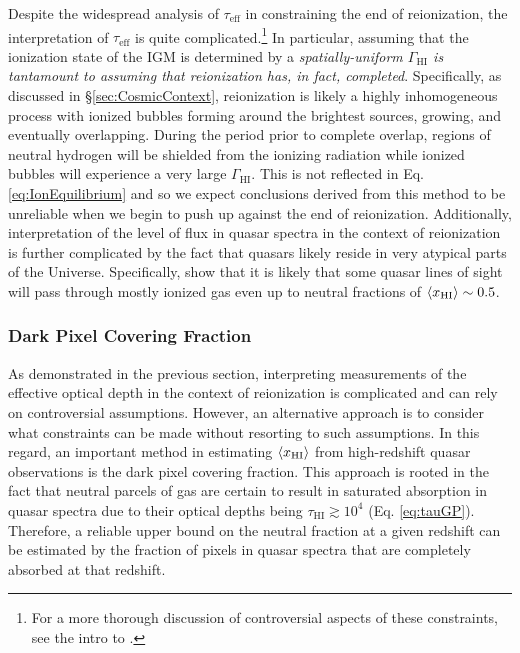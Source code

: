 Despite the widespread analysis of $\tau_{\text{eff}}$ in constraining the end of reionization, the interpretation of $\tau_{\text{eff}}$ is quite complicated.\footnote{For a more thorough discussion of controversial aspects of these constraints, see the intro to \citet{McGreer:2011dm}.} In particular, assuming that the ionization state of the IGM is determined by a \textit{spatially-uniform $\Gamma_{\text{HI}}$ is tantamount to assuming that reionization has, in fact, completed}. Specifically, as discussed in \S \ref{sec:CosmicContext}, reionization is likely a highly inhomogeneous process with ionized bubbles forming around the brightest sources, growing, and eventually overlapping. During the period prior to complete overlap, regions of neutral hydrogen will be shielded from the ionizing radiation while ionized bubbles will experience a very large $\Gamma_{\text{HI}}$. This is not reflected in Eq. \ref{eq:IonEquilibrium} and so we expect conclusions derived from this method to be unreliable when we begin to push up against the end of reionization. Additionally, interpretation of the level of flux in quasar spectra in the context of reionization is further complicated by the fact that quasars likely reside in very atypical parts of the Universe. Specifically, \citet{Lidz:2007mz} show that it is likely that some quasar lines of sight will pass through mostly ionized gas even up to neutral fractions of $\langle x_{\text{HI}}\rangle \sim 0.5$. 

%
%

\clearpage
\subsubsection{Dark Pixel Covering Fraction}

As demonstrated in the previous section, interpreting measurements of the effective optical depth in the context of reionization is complicated and can rely on controversial assumptions. However, an alternative approach is to consider what constraints can be made without resorting to such assumptions. In this regard, an important method in estimating $\langle x_{\text{HI}}\rangle$ from high-redshift quasar observations is the dark pixel covering fraction. This approach is rooted in the fact that neutral parcels of gas are certain to result in saturated absorption in quasar spectra due to their optical depths being $\tau_{\text{HI}} \gtrsim 10^4$ (Eq. \ref{eq:tauGP}). Therefore, a reliable upper bound on the neutral fraction at a given redshift can be estimated by the fraction of pixels in quasar spectra that are completely absorbed at that redshift. 

